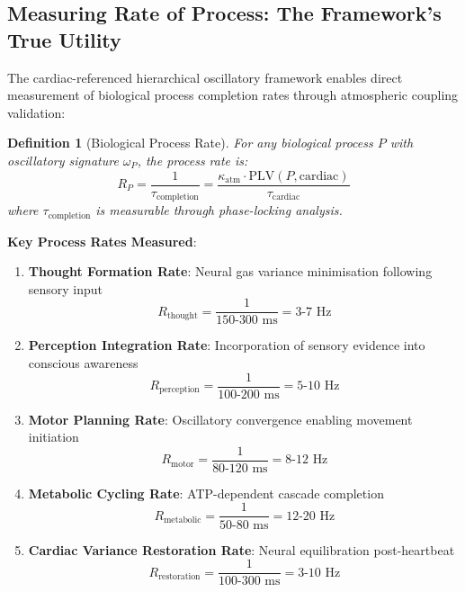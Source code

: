 \documentclass[12pt]{article}
\newtheorem{definition}[theorem]{Definition}
\theoremstyle{remark}
\begin{document}
\subsection{Measuring Rate of Process: The Framework's True Utility}

The cardiac-referenced hierarchical oscillatory framework enables direct measurement of biological process completion rates through atmospheric coupling validation:

\begin{definition}[Biological Process Rate]
For any biological process $P$ with oscillatory signature $\omega_P$, the process rate is:
\begin{equation}
R_P = \frac{1}{\tau_{\text{completion}}} = \frac{\kappa_{\text{atm}} \cdot \text{PLV}(P, \text{cardiac})}{\tau_{\text{cardiac}}}
\end{equation}
where $\tau_{\text{completion}}$ is measurable through phase-locking analysis.
\end{definition}

\textbf{Key Process Rates Measured}:

\begin{enumerate}
\item \textbf{Thought Formation Rate}: Neural gas variance minimisation following sensory input
\begin{equation}
R_{\text{thought}} = \frac{1}{150\text{-}300 \text{ ms}} = 3\text{-}7 \text{ Hz}
\end{equation}

\item \textbf{Perception Integration Rate}: Incorporation of sensory evidence into conscious awareness
\begin{equation}
R_{\text{perception}} = \frac{1}{100\text{-}200 \text{ ms}} = 5\text{-}10 \text{ Hz}
\end{equation}

\item \textbf{Motor Planning Rate}: Oscillatory convergence enabling movement initiation
\begin{equation}
R_{\text{motor}} = \frac{1}{80\text{-}120 \text{ ms}} = 8\text{-}12 \text{ Hz}
\end{equation}

\item \textbf{Metabolic Cycling Rate}: ATP-dependent cascade completion
\begin{equation}
R_{\text{metabolic}} = \frac{1}{50\text{-}80 \text{ ms}} = 12\text{-}20 \text{ Hz}
\end{equation}

\item \textbf{Cardiac Variance Restoration Rate}: Neural equilibration post-heartbeat
\begin{equation}
R_{\text{restoration}} = \frac{1}{100\text{-}300 \text{ ms}} = 3\text{-}10 \text{ Hz}
\end{equation}
\end{enumerate}
\end{document}
